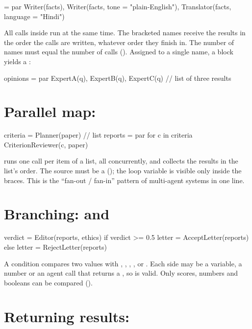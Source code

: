\begin{algo} = par {
    Writer(facts),
    Writer(facts, tone = "plain-English"),
    Translator(facts, language = "Hindi")
}
\end{algo}

All calls inside  run at the same time. The bracketed names receive the results in the order the calls are written, whatever order they finish in. The number of names must equal the number of calls (). Assigned to a single name, a  block yields a :

\begin{algo}
opinions = par { ExpertA(q), ExpertB(q), ExpertC(q) }   // list of three results
\end{algo}

\section{Parallel map: }

\begin{algo}
criteria = Planner(paper)                                    // list
reports  = par for c in criteria { CriterionReviewer(c, paper) }
\end{algo}

 runs one call per item of a list, all concurrently, and collects the results in the list's order. The source must be a  (); the loop variable is visible only inside the braces. This is the ``fan-out / fan-in'' pattern of multi-agent systems in one line.

\section{Branching:  and }

\begin{algo}
verdict = Editor(reports, ethics)
if verdict >= 0.5 {
    letter = AcceptLetter(reports)
} else {
    letter = RejectLetter(reports)
}
\end{algo}

A condition compares two values with \code{<}, \code{<=}, \code{>}, \code{>=}, \code{==} or \code{!=}. Each side may be a variable, a number or an agent call that returns a , so  is valid. Only scores, numbers and booleans can be compared ().

\section{Returning results: }

